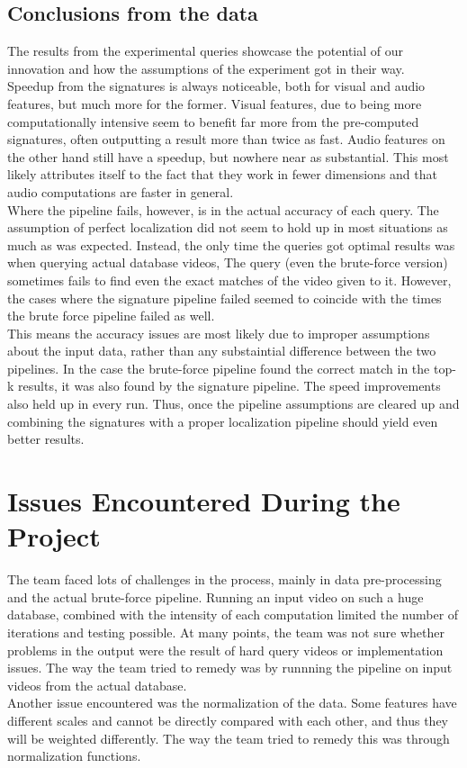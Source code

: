 \documentclass{article}
\newcommand\tab[1][1cm]{\hspace*{#1}}
\begin{document}
\subsection*{Conclusions from the data}
\tab The results from the experimental queries showcase the potential of our innovation and how the assumptions of the experiment got in their way. \\ \tab Speedup from the signatures is always noticeable, both for visual and audio features, but much more for the former. Visual features, due to being more computationally intensive seem to benefit far more from the pre-computed signatures, often outputting a result more than twice as fast. Audio features on the other hand still have a speedup, but nowhere near as substantial. This most likely attributes itself to the fact that they work in fewer dimensions and that audio computations are faster in general. \\
\tab Where the pipeline fails, however, is in the actual accuracy of each query. The assumption of perfect localization did not seem to hold up in most situations as much as was expected. Instead, the only time the queries got optimal results was when querying actual database videos, The query (even the brute-force version) sometimes fails to find even the exact matches of the video given to it. However, the cases where the signature pipeline failed seemed to coincide with the times the brute force pipeline failed as well. \\
\tab This means the accuracy issues are most likely due to improper assumptions about the input data, rather than any substaintial difference between the two pipelines. In the case the brute-force pipeline found the correct match in the top-k results, it was also found by the signature pipeline. The speed improvements also held up in every run. Thus, once the pipeline assumptions are cleared up and combining the signatures with a proper localization pipeline should yield even better results.

\section*{Issues Encountered During the Project } \tab The team faced lots of challenges in the process, mainly in data pre-processing and the actual brute-force pipeline. Running an input video on such a huge database, combined with the intensity of each computation limited the number of iterations and testing possible. At many points, the team was not sure whether problems in the output were the result of hard query videos or implementation issues. The way the team tried to remedy was by runnning the pipeline on input videos from the actual database. \\ \tab Another issue encountered was the normalization of the data. Some features have different scales and cannot be directly compared with each other, and thus they will be weighted differently. The way the team tried to remedy this was through normalization functions. 
\end{document}
